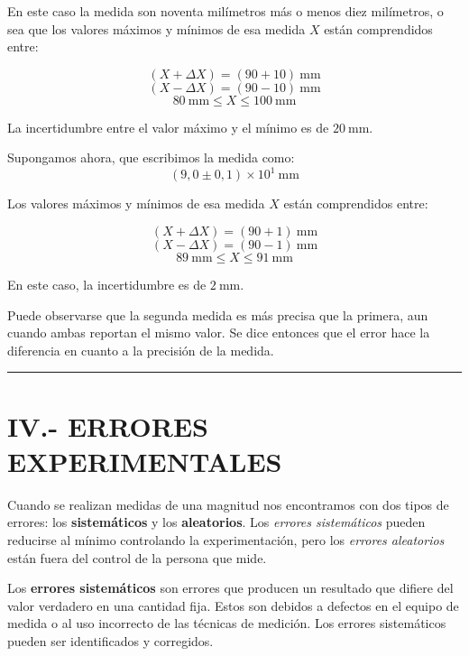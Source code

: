 \documentclass[12pt,a4paper]{article}
\begin{document}
En este caso la medida son noventa milímetros más o menos diez milímetros, o sea que los valores máximos y mínimos de esa medida $X$ están comprendidos entre:

\[ (X + \Delta X) = (90 + 10)\ \text{mm} \]
\[ (X - \Delta X) = (90 - 10)\ \text{mm} \]
\[ 80\ \text{mm} \leq X \leq 100\ \text{mm} \]

La incertidumbre entre el valor máximo y el mínimo es de $20\ \text{mm}$.

Supongamos ahora, que escribimos la medida como: 
\[ (9,0 \pm 0,1) \times 10^1\ \text{mm} \]

Los valores máximos y mínimos de esa medida $X$ están comprendidos entre:

\[ (X + \Delta X) = (90 + 1)\ \text{mm} \]
\[ (X - \Delta X) = (90 - 1)\ \text{mm} \]
\[ 89\ \text{mm} \leq X \leq 91\ \text{mm} \]

En este caso, la incertidumbre es de $2\ \text{mm}$.

Puede observarse que la segunda medida es más precisa que la primera, aun cuando ambas reportan el mismo valor. Se dice entonces que el error hace la diferencia en cuanto a la precisión de la medida.

\vspace{0.5cm}
\hrule
\vspace{0.5cm}

\section{IV.- ERRORES EXPERIMENTALES}

Cuando se realizan medidas de una magnitud nos encontramos con dos tipos de errores: los \textbf{sistemáticos} y los \textbf{aleatorios}. Los \textit{errores sistemáticos} pueden reducirse al mínimo controlando la experimentación, pero los \textit{errores aleatorios} están fuera del control de la persona que mide.

Los \textbf{errores sistemáticos} son errores que producen un resultado que difiere del valor verdadero en una cantidad fija. Estos son debidos a defectos en el equipo de medida o al uso incorrecto de las técnicas de medición. Los errores sistemáticos pueden ser identificados y corregidos.
\end{document}
